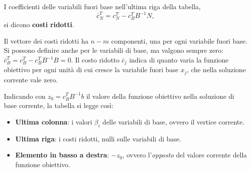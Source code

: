 \begin{definizione}\label{def:costi-ridotti}
I coefficienti delle variabili fuori base nell'ultima riga della tabella,
\[
\bar{c}_N^T = c_N^T - c_B^T B^{-1} N,
\]
si dicono \textbf{costi ridotti}.
\end{definizione}

Il vettore dei costi ridotti ha $n - m$ componenti, una per ogni variabile fuori base. Si possono definire anche per le variabili di base, ma valgono sempre zero: $\bar{c}_B^T = c_B^T - c_B^T B^{-1} B = 0$. Il costo ridotto $\bar{c}_j$ indica di quanto varia la funzione obiettivo per ogni unità di cui cresce la variabile fuori base $x_j$, che nella soluzione corrente vale zero.

Indicando con $z_0 = c_B^T B^{-1} b$ il valore della funzione obiettivo nella soluzione di base corrente, la tabella si legge così:
\begin{itemize}
    \item \textbf{Ultima colonna}: i valori $\beta_i$ delle variabili di base, ovvero il vertice corrente.
    \item \textbf{Ultima riga}: i costi ridotti, nulli sulle variabili di base.
    \item \textbf{Elemento in basso a destra}: $-z_0$, ovvero l'\emph{opposto} del valore corrente della funzione obiettivo.
\end{itemize}


